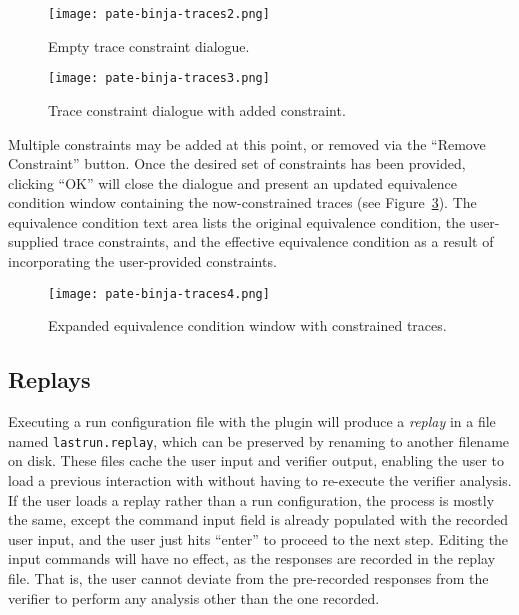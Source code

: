 \begin{figure}[h]
  \centering
  \texttt{[image: pate-binja-traces2.png]}
  \caption{Empty trace constraint dialogue.}
  \label{fig:trace-constr-empty}
\end{figure}

\begin{figure}[h]
  \centering
  \texttt{[image: pate-binja-traces3.png]}
  \caption{Trace constraint dialogue with added constraint.}
  \label{fig:trace-constr-one}
\end{figure}

Multiple constraints may be added at this point, or removed via the ``Remove Constraint'' button. Once the desired set of constraints
has been provided, clicking ``OK'' will close the dialogue and present an updated equivalence condition window containing the
now-constrained traces (see Figure~\ref{fig:equiv-cond-constrained}). The equivalence condition text area lists the original equivalence condition, the user-supplied trace constraints, and the effective equivalence condition as a result of incorporating the user-provided constraints.

\begin{figure}[h]
  \centering
  \texttt{[image: pate-binja-traces4.png]}
  \caption{Expanded equivalence condition window with constrained traces.}
  \label{fig:equiv-cond-constrained}
\end{figure}

\subsection{Replays}

Executing a run configuration file with the \pate{} plugin will produce a \emph{replay} in a file named \texttt{lastrun.replay}, which can be preserved by renaming to another filename on disk.
These files cache the user input and verifier output, enabling the user to load a previous interaction with \pate{} without having to re-execute the verifier analysis.
If the user loads a replay rather than a run configuration, the process is mostly the same, except the command input field is already populated with the recorded user input, and the user just hits ``enter'' to proceed to the next step.
Editing the input commands will have no effect, as the responses are recorded in the replay file.
That is, the user cannot deviate from the pre-recorded responses from the \pate{} verifier to perform any analysis other than the one recorded.

